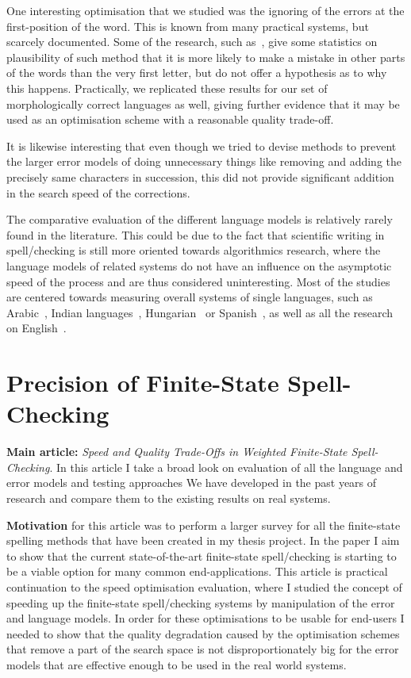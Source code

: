 \documentclass[officiallayout]{unihelcompling}
\begin{document}
One interesting optimisation that we studied was the ignoring of the errors at
the first-position of the word. This is known from many practical systems, but
scarcely documented. Some of the research, such as~\citet{bhagat2007spelling},
give some statistics on plausibility of such method that it is more likely to
make a mistake in other parts of the words than the very first letter, but do
not offer a hypothesis as to why this happens.  Practically, we replicated
these results for our set of morphologically correct languages as well, giving
further evidence that it may be used as an optimisation scheme with a
reasonable quality trade-off.

It is likewise interesting that even though we tried to devise methods to
prevent the larger error models of doing unnecessary things like removing and
adding the precisely same characters in succession, this did not provide
significant addition in the search speed of the corrections.

The comparative evaluation of the different language models is relatively
rarely found in the literature. This could be due to the fact that scientific
writing in spell\-/checking is still more oriented towards algorithmics research,
where the language models of related systems do not have an influence on the
asymptotic speed of the process and are thus considered uninteresting.  Most of
the studies are centered towards measuring overall systems of single languages,
such as Arabic~\citep{attia2013improved}, Indian
languages~\citep{chaudhuri2002towards}, Hungarian~\citep{tron2005hunmorph} or
Spanish~\cite{otero2007contextual}, as well as all the research on
English~\citep{mitton1987spelling}.

\section{Precision of Finite-State Spell-Checking}
\label{sec:quality}

\textbf{Main article:} \emph{Speed and Quality Trade-Offs in Weighted
Finite-State Spell-Checking}. In this article I take a broad look on evaluation
of all the language and error models and testing approaches We have developed
in the past years of research and compare them to the existing results on real
systems.

\textbf{Motivation} for this article was to perform a larger survey for all the
finite-state spelling methods that have been created in my thesis project. In
the paper I aim to show that the current state-of-the-art finite-state
spell\-/checking is starting to be a viable option for many common
end-applications. This article is practical continuation to the speed
optimisation evaluation, where I studied the concept of speeding up the
finite-state spell\-/checking systems by manipulation of the error and language
models. In order for these optimisations to be usable for end-users I needed to
show that the quality degradation caused by the optimisation schemes that
remove a part of the search space is not disproportionately big for the error
models that are effective enough to be used in the real world systems.
\end{document}
